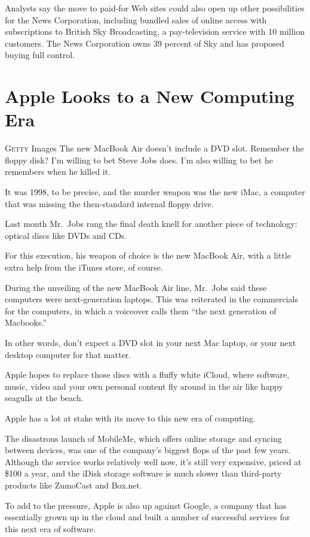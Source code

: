 ﻿\documentclass[12pt]{article}
\begin{document}
Analysts say the move to paid-for Web sites could also open up other possibilities for the News
Corporation, including bundled sales of online access with subscriptions to British Sky
Broadcasting, a pay-television service with 10 million customers. The News Corporation owns 39
percent of Sky and has proposed buying full control.

\section{Apple Looks to a New Computing Era}

\lettrine{G}{etty} Images The new MacBook Air doesn't include a DVD slot.
Remember the floppy disk? I'm willing to bet Steve Jobs does. I'm also willing to bet he remembers
when he killed it.

It was 1998, to be precise, and the murder weapon was the new iMac, a computer that was missing the
then-standard internal floppy drive.

Last month Mr.~Jobs rang the final death knell for another piece of technology: optical discs like
DVDs and CDs.

For this execution, his weapon of choice is the new MacBook Air, with a little extra help from the
iTunes store, of course.

During the unveiling of the new MacBook Air line, Mr.~Jobs said these computers were next-generation
laptops. This was reiterated in the commercials for the computers, in which a voiceover calls them
``the next generation of Macbooks.''

In other words, don't expect a DVD slot in your next Mac laptop, or your next desktop computer for
that matter.

Apple hopes to replace those discs with a fluffy white iCloud, where software, music, video and your
own personal content fly around in the air like happy seagulls at the beach.

Apple has a lot at stake with its move to this new era of computing.

The disastrous launch of MobileMe, which offers online storage and syncing between devices, was one
of the company's biggest flops of the past few years. Although the service works relatively well
now, it's still very expensive, priced at \$100 a year, and the iDisk storage software is much
slower than third-party products like ZumoCast and Box.net.

To add to the pressure, Apple is also up against Google, a company that has essentially grown up in
the cloud and built a number of successful services for this next era of software.
\end{document}
